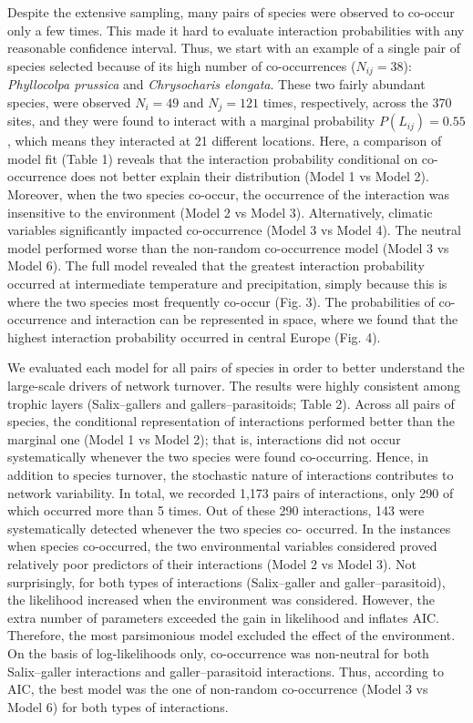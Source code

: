 \documentclass[12pt]{article}
\begin{document}
Despite the extensive sampling, many pairs of species were observed to co-occur
only a few times. This made it hard to evaluate interaction probabilities with
any reasonable confidence interval. Thus, we start with an example of a single
pair of species selected because of its high number of co-occurrences
($N_{ij}=38$): \textit{Phyllocolpa prussica} and \textit{Chrysocharis
elongata}. These two fairly abundant species, were observed $N_i=49$ and $N_j=121$
times, respectively, across the 370 sites, and they were found to
interact with a marginal probability $P(L_{ij})=0.55$, which means they
interacted at 21 different locations. Here, a comparison of model fit (Table
1) reveals that the interaction probability conditional on co-occurrence
does not better explain their distribution (Model 1 vs Model 2). Moreover, when the two
species co-occur, the occurrence of the interaction was insensitive to the
environment (Model 2 vs Model 3). Alternatively, climatic variables
significantly impacted co-occurrence (Model 3 vs Model 4). The neutral model
performed worse than the non-random co-occurrence model (Model 3 vs Model 6).
The full model revealed that the greatest interaction probability occurred at
intermediate temperature and precipitation, simply because this is where the
two species most frequently co-occur (Fig. 3). The probabilities of co-occurrence
and interaction can be represented in space, where we found that the
highest interaction probability occurred in central Europe (Fig. 4).

We evaluated each model for all pairs of species in order to better understand
the large-scale drivers of network turnover. The results were highly consistent
among trophic layers (Salix–gallers and gallers–parasitoids; Table 2). Across
all pairs of species, the conditional representation of interactions performed 
better than the marginal one (Model 1 vs Model 2); that is, interactions did
not occur systematically whenever the two species were found co-occurring.
Hence, in addition to species turnover, the stochastic nature of interactions
contributes to network variability. In total, we recorded 1,173 pairs of
interactions, only 290 of which occurred more than 5 times. Out of these 290
interactions, 143 were systematically detected whenever the two species co-
occurred. In the instances when species co-occurred, the two environmental
variables considered proved relatively poor predictors of their interactions
(Model 2 vs Model 3). Not surprisingly, for both types of interactions
(Salix–galler and galler–parasitoid), the likelihood increased when the
environment was considered. However, the extra number of parameters exceeded the
gain in likelihood and inflates AIC. Therefore, the most parsimonious model
excluded the effect of the environment. On the basis of log-likelihoods only,
co-occurrence was non-neutral for both Salix–galler interactions and
galler–parasitoid interactions. Thus, according to AIC, the best model was the
one of non-random co-occurrence (Model 3 vs Model 6) for both types of
interactions.
\end{document}
